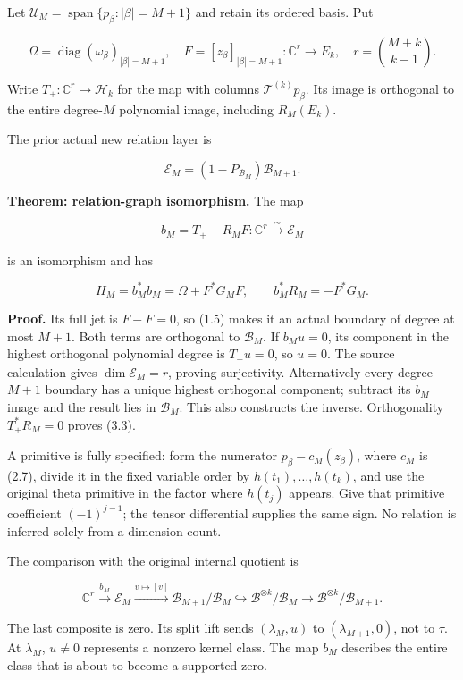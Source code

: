 Let \(\mathcal U_M=\operatorname{span}\{p_\beta:|\beta|=M+1\}\) and
retain its ordered basis. Put

\[\Omega=\operatorname{diag}(\omega_\beta)_{|\beta|=M+1},\quad
F=[z_\beta]_{|\beta|=M+1}:\mathbb C^r\to E_k,\quad
r=\binom{M+k}{k-1}.\tag{3.1}\]

Write \(T_+:\mathbb C^r\to\mathcal H_k\) for the map with columns
\(\mathcal T^{(k)}p_\beta\). Its image is orthogonal to the entire
degree-\(M\) polynomial image, including \(R_M(E_k)\).

The prior actual new relation layer is

\[\mathcal E_M=(1-P_{\mathcal B_M})\mathcal B_{M+1}.\]

\textbf{Theorem: relation-graph isomorphism.} The map

\[\boxed{b_M=T_+-R_MF:\mathbb C^r\xrightarrow{\sim}\mathcal E_M}\tag{3.2}\]

is an isomorphism and has

\[\boxed{H_M=b_M^*b_M=\Omega+F^*G_MF,\qquad b_M^*R_M=-F^*G_M.}\tag{3.3}\]

\textbf{Proof.} Its full jet is \(F-F=0\), so (1.5) makes it an actual
boundary of degree at most \(M+1\). Both terms are orthogonal to
\(\mathcal B_M\). If \(b_Mu=0\), its component in the highest orthogonal
polynomial degree is \(T_+u=0\), so \(u=0\). The source calculation
gives \(\dim\mathcal E_M=r\), proving surjectivity. Alternatively every
degree-\(M+1\) boundary has a unique highest orthogonal component;
subtract its \(b_M\) image and the result lies in \(\mathcal B_M\). This
also constructs the inverse. Orthogonality \(T_+^*R_M=0\) proves (3.3).

A primitive is fully specified: form the numerator
\(p_\beta-c_M(z_\beta)\), where \(c_M\) is (2.7), divide it in the fixed
variable order by \(h(t_1),\ldots,h(t_k)\), and use the original theta
primitive in the factor where \(h(t_j)\) appears. Give that primitive
coefficient \((-1)^{j-1}\); the tensor differential supplies the same
sign. No relation is inferred solely from a dimension count.

The comparison with the original internal quotient is

\[\mathbb C^r\xrightarrow{b_M}\mathcal E_M
\xrightarrow{v\mapsto[v]}\mathcal B_{M+1}/\mathcal B_M
\hookrightarrow\mathscr B^{\otimes k}/\mathcal B_M
\longrightarrow\mathscr B^{\otimes k}/\mathcal B_{M+1}.\tag{3.4}\]

The last composite is zero. Its split lift sends \((\lambda_M,u)\) to
\((\lambda_{M+1},0)\), not to \(\tau\). At \(\lambda_M\), \(u\ne0\)
represents a nonzero kernel class. The map \(b_M\) describes the entire
class that is about to become a supported zero.

